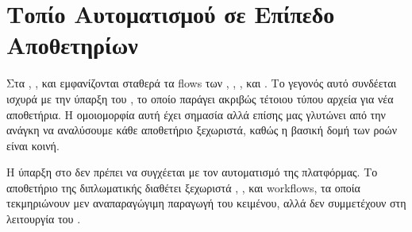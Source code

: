 \section{Τοπίο Αυτοματισμού σε Επίπεδο Αποθετηρίων}
\label{sec:appendix_workflow_landscape}

Στα \texttt{}, \texttt{},
\texttt{} και \texttt{} εμφανίζονται σταθερά τα flows των , ,
,  και . Το γεγονός αυτό συνδέεται ισχυρά με την ύπαρξη του \texttt{},
το οποίο παράγει ακριβώς τέτοιου τύπου αρχεία για νέα αποθετήρια. Η ομοιομορφία αυτή έχει σημασία αλλά 
επίσης μας γλυτώνει από την ανάγκη να αναλύσουμε κάθε αποθετήριο ξεχωριστά, καθώς η βασική δομή των ροών είναι κοινή.

Η ύπαρξη  στο \texttt{} δεν πρέπει να συγχέεται με τον αυτοματισμό της πλατφόρμας.
Το αποθετήριο της διπλωματικής διαθέτει ξεχωριστά , ,  και  workflows,
τα οποία τεκμηριώνουν μεν αναπαραγώγιμη παραγωγή του κειμένου, αλλά δεν συμμετέχουν στη λειτουργία του .



\begin{table}[H]
\centering
\caption{Συγκριτική χαρτογράφηση των κύριων  στα βασικά αποθετήρια}
\label{tab:appendix_repo_workflow_matrix}

\end{table}
